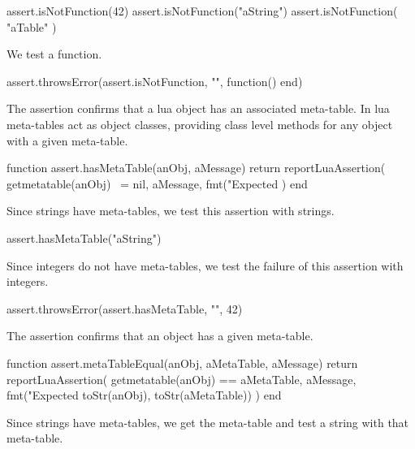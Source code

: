 \startLuaTest
  assert.isNotFunction(42)
  assert.isNotFunction("aString")
  assert.isNotFunction({ "aTable" })
\stopLuaTest
\stopTestCase


We test a function.

\startLuaTest
  assert.throwsError(assert.isNotFunction, "", function() end)
\stopLuaTest
\stopTestCase

\stopTestSuite


The  assertion confirms that a lua object has an 
associated meta-table. In lua meta-tables act as object classes, providing 
class level methods for any object with a given meta-table. 

\startLuaCode
function assert.hasMetaTable(anObj, aMessage)
  return reportLuaAssertion(
    getmetatable(anObj) ~= nil,
    aMessage,
    fmt("Expected %
  )
end
\stopLuaCode


Since strings have meta-tables, we test this assertion with strings.

\startLuaTest
  assert.hasMetaTable("aString")
\stopLuaTest
\stopTestCase


Since integers do not have meta-tables, we test the failure of this 
assertion with integers. 

\startLuaTest
  assert.throwsError(assert.hasMetaTable, "", 42)
\stopLuaTest
\stopTestCase

\stopTestSuite


The  assertion confirms that an object has a 
given meta-table. 

\startLuaCode
function assert.metaTableEqual(anObj, aMetaTable, aMessage)
  return reportLuaAssertion(
    getmetatable(anObj) == aMetaTable,
    aMessage,
    fmt("Expected %
      toStr(anObj), toStr(aMetaTable))
  )
end
\stopLuaCode


Since strings have meta-tables, we get the meta-table and test a string 
with that meta-table. 

